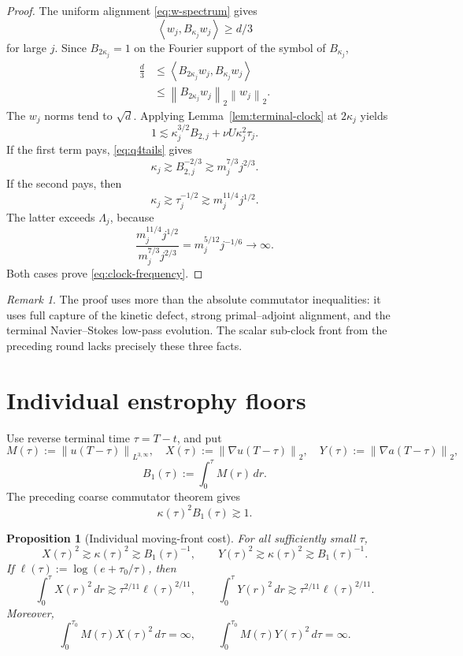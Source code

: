 \documentclass[11pt]{article}
\newtheorem{proposition}[theorem]{Proposition}
\theoremstyle{remark}
\newtheorem{remark}[theorem]{Remark}
\newcommand{\norm}[1]{\left\|#1\right\|}
\newcommand{\ip}[2]{\left\langle#1,#2\right\rangle}
\begin{document}
\begin{proof}
The uniform alignment \eqref{eq:w-spectrum} gives
\[
 \ip{w_j}{B_{\kappa_j}w_j}\geq d/3
\]
for large \(j\).  Since \(B_{2\kappa_j}=1\) on the Fourier support of
the symbol of \(B_{\kappa_j}\),
\[
\begin{aligned}
 \frac d3
 &\leq
 \ip{B_{2\kappa_j}w_j}{B_{\kappa_j}w_j}\\
 &\leq
 \norm{B_{2\kappa_j}w_j}_2\norm{w_j}_2.
\end{aligned}
\]
The \(w_j\) norms tend to \(\sqrt d\).  Applying
Lemma~\ref{lem:terminal-clock} at \(2\kappa_j\) yields
\[
 1\lesssim
 \kappa_j^{3/2}B_{2,j}
 +\nu U\kappa_j^2\tau_j.
\]
If the first term pays, \eqref{eq:q4tails} gives
\[
 \kappa_j\gtrsim B_{2,j}^{-2/3}
 \gtrsim m_j^{7/3}j^{2/3}.
\]
If the second pays, then
\[
 \kappa_j\gtrsim\tau_j^{-1/2}
 \gtrsim m_j^{11/4}j^{1/2}.
\]
The latter exceeds \(\Lambda_j\), because
\[
 \frac{m_j^{11/4}j^{1/2}}
 {m_j^{7/3}j^{2/3}}
 =
 m_j^{5/12}j^{-1/6}\longrightarrow\infty.
\]
Both cases prove \eqref{eq:clock-frequency}.
\end{proof}

\begin{remark}
The proof uses more than the absolute commutator inequalities: it uses
full capture of the kinetic defect, strong primal--adjoint alignment,
and the terminal Navier--Stokes low-pass evolution.  The scalar
sub-clock front from the preceding round lacks precisely these three
facts.
\end{remark}

\section{Individual enstrophy floors}

Use reverse terminal time \(\tau=T-t\), and put
\[
 M(\tau):=\norm{u(T-\tau)}_{L^{3,\infty}},\quad
 X(\tau):=\norm{\nabla u(T-\tau)}_2,\quad
 Y(\tau):=\norm{\nabla a(T-\tau)}_2,
\]
\[
 B_1(\tau):=\int_0^\tau M(r)\,dr.
\]
The preceding coarse commutator theorem gives
\begin{equation}
\label{eq:coarse-front}
 \kappa(\tau)^2B_1(\tau)\gtrsim1.
\end{equation}

\begin{proposition}[Individual moving-front cost]
\label{prop:individual}
For all sufficiently small \(\tau\),
\begin{equation}
\label{eq:individual}
 X(\tau)^2\gtrsim\kappa(\tau)^2
 \gtrsim B_1(\tau)^{-1},
 \qquad
 Y(\tau)^2\gtrsim\kappa(\tau)^2
 \gtrsim B_1(\tau)^{-1}.
\end{equation}
If
\(\ell(\tau):=\log(e+\tau_0/\tau)\), then
\begin{equation}
\label{eq:individual-tails}
 \int_0^\tau X(r)^2\,dr
 \gtrsim\tau^{2/11}\ell(\tau)^{2/11},
 \qquad
 \int_0^\tau Y(r)^2\,dr
 \gtrsim\tau^{2/11}\ell(\tau)^{2/11}.
\end{equation}
Moreover,
\begin{equation}
\label{eq:weighted-both}
 \int_0^{\tau_0}M(\tau)X(\tau)^2\,d\tau=\infty,
 \qquad
 \int_0^{\tau_0}M(\tau)Y(\tau)^2\,d\tau=\infty.
\end{equation}
\end{proposition}
\end{document}

